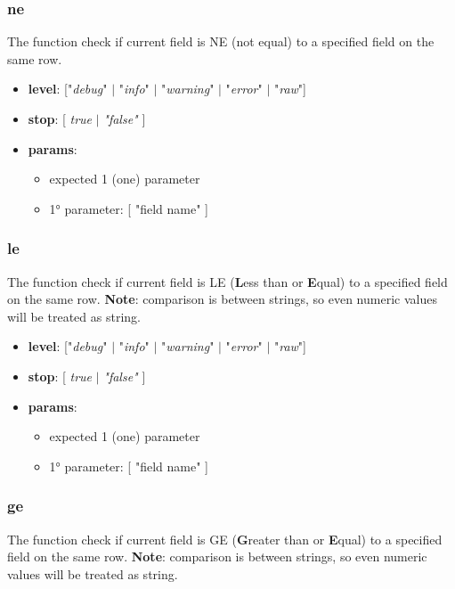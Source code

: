 \documentclass[12pt, a4paper]{book}
\begin{document}
\subsubsection{ne}
\begin{justify}
The function check if current field is NE (not equal) to a specified field on the same row.
\end{justify}

\begin{itemize}
\item \textbf{level}: ["\textit{debug}" $|$ "\textit{info}" $|$ "\textit{warning}" $|$ "\textit{error}" $|$ "\textit{raw}"]
\item \textbf{stop}: [ \textit{true} $|$ \textit{"false"} ]
\item \textbf{params}: 
  \begin{itemize}
  \item expected 1 (one) parameter
  \item 1° parameter: [ "field name" ]
  \end{itemize}
\end{itemize}


\subsubsection{le}
\begin{justify}
The function check if current field is LE (\textbf{L}ess than or \textbf{E}qual) to a specified field on the same row.
\textbf{Note}: comparison is between strings, so even numeric values will be treated as string.
\end{justify}

\begin{itemize}
\item \textbf{level}: ["\textit{debug}" $|$ "\textit{info}" $|$ "\textit{warning}" $|$ "\textit{error}" $|$ "\textit{raw}"]
\item \textbf{stop}: [ \textit{true} $|$ \textit{"false"} ]
\item \textbf{params}: 
  \begin{itemize}
  \item expected 1 (one) parameter
  \item 1° parameter: [ "field name" ]
  \end{itemize}
\end{itemize}


\subsubsection{ge}
\begin{justify}
The function check if current field is GE (\textbf{G}reater than or \textbf{E}qual) to a specified field on the same row.
\textbf{Note}: comparison is between strings, so even numeric values will be treated as string.
\end{justify}
\end{document}
